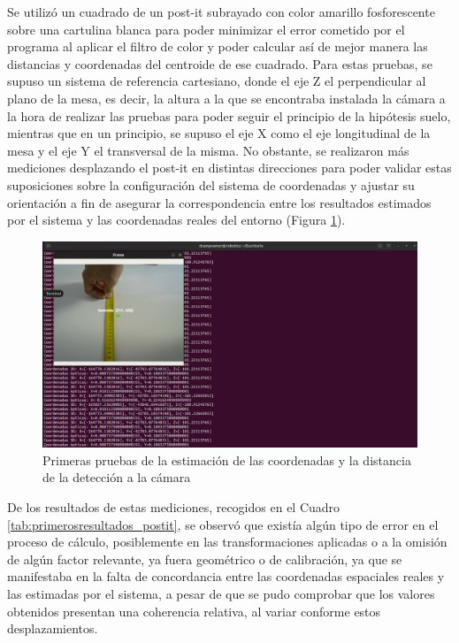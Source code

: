 Se utilizó un cuadrado de un post-it subrayado con color amarillo fosforescente sobre una cartulina blanca para poder minimizar el error cometido por el programa al aplicar el filtro de color y poder calcular así de mejor manera las distancias y coordenadas del centroide de ese cuadrado. Para estas pruebas, se supuso un sistema de referencia cartesiano, donde el eje Z el perpendicular al plano de la mesa, es decir, la altura a la que se encontraba instalada la cámara a la hora de realizar las pruebas para poder seguir el principio de la hipótesis suelo, mientras que en un principio, se supuso el eje X como el eje longitudinal de la mesa y el eje Y el transversal de la misma. No obstante, se realizaron más mediciones desplazando el post-it en distintas direcciones para poder validar estas suposiciones sobre la configuración del sistema de coordenadas y ajustar su orientación a fin de asegurar la correspondencia entre los resultados estimados por el sistema y las coordenadas reales del entorno (Figura \ref{fig:primera_estimacion_postit}).

  \begin{figure}[H]
     \centering
     \begin{center}
       \includegraphics[width=115mm]{figs/Punto inicial 30cm.png}
     \end{center}
     \caption{Primeras pruebas de la estimación de las coordenadas y la distancia de la detección a la cámara}
    \label{fig:primera_estimacion_postit}
  \end{figure}

De los resultados de estas mediciones, recogidos en el Cuadro \ref{tab:primerosresultados_postit}, se observó que existía algún tipo de error en el proceso de cálculo, posiblemente en las transformaciones aplicadas o a la omisión de algún factor relevante, ya fuera geométrico o de calibración, ya que se manifestaba en la falta de concordancia entre las coordenadas espaciales reales y las estimadas por el sistema, a pesar de que se pudo comprobar que los valores obtenidos presentan una coherencia relativa, al variar conforme estos desplazamientos.

